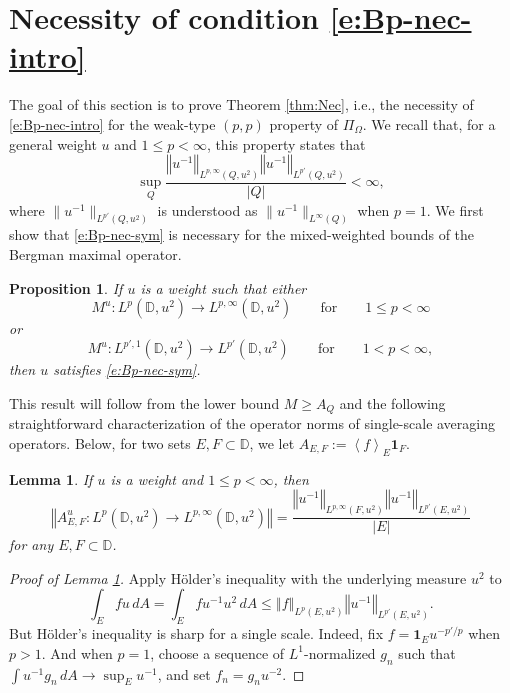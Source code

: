 \documentclass{amsart}
\newcommand{\norm}[1]{\left\Vert {#1}\right\Vert}
\newcommand{\avg}[1]{\left\langle {#1}\right\rangle}
\newtheorem{lemma}[theorem]{Lemma}
\newtheorem{proposition}[theorem]{Proposition}
\theoremstyle{definition}
\numberwithin{equation}{section}
\begin{document}
\section{\texorpdfstring{\boldmath Necessity of condition \eqref{e:Bp-nec-intro}}{}}\label{s:Necessity}

The goal of this section is to prove Theorem \ref{thm:Nec}, i.e., the necessity of \eqref{e:Bp-nec-intro} for the weak-type $(p,p)$ property of $\Pi_{\Omega}$. We recall that, for a general weight $u$ and $1 \leq p<\infty$, this property states that \begin{equation} \sup_Q \frac{\norm{ u^{-1} }_{L^{p,\infty}(Q,u^2)} \norm{u^{-1}}_{L^{p'}(Q,u^2)}}{|Q|} < \infty, \label{e:Bp-nec-sym} \end{equation} where $\|u^{-1}\|_{L^{p'}(Q,u^2)}$ is understood as $\|u^{-1}\|_{L^{\infty}(Q)}$ when $p=1$. We first show that \eqref{e:Bp-nec-sym} is necessary for the mixed-weighted bounds of the Bergman maximal operator. 
\begin{proposition}\label{prop:nec} 
If $u$ is a weight such that either
\[
    M^u\colon L^p(\mathbb{D},u^2) \to L^{p,\infty}(\mathbb{D},u^2) \quad\quad\text{for}\quad\quad1 \le p < \infty
\]
or
\[
    M^u \colon L^{p',1}(\mathbb{D},u^2) \to L^{p'}(\mathbb{D},u^2) \quad\quad\text{for}\quad\quad 1 < p < \infty,
\]
then $u$ satisfies \eqref{e:Bp-nec-sym}.
\end{proposition}
This result will follow from the lower bound $M \ge A_Q$ and the following straightforward characterization of the operator norms of single-scale averaging operators. Below, for two sets $E,F \subset \mathbb D$, we let $A_{E,F} := \avg{f}_E \mathbf 1_F$.
\begin{lemma}\label{l:single-scale}
 If $u$ is a weight and $1 \le p < \infty$, then 
    \[ \norm{ A_{E,F}^u \colon L^{p}(\mathbb{D},u^2) \to L^{p,\infty}(\mathbb{D},u^2) } = \frac{\norm{ u^{-1} }_{L^{p,\infty}(F,u^2)} \norm{u^{-1}}_{L^{p'}(E,u^2)}}{|E|}\]
    for any $E,F \subset \mathbb{D}$.
\end{lemma}
\begin{proof}[Proof of Lemma \ref{l:single-scale}]
    Apply H\"older's inequality with the underlying measure $u^2$ to
        \[ \int_E fu \, dA = \int_E f u^{-1} u^2 \, dA \le \norm{f}_{L^{p}(E,u^2)} \norm{u^{-1}}_{L^{p'}(E,u^2)}.\]
    But H\"older's inequality is sharp for a single scale. Indeed, fix $f= \mathbf 1_E u^{-p'/p}$ when $p>1$. And when $p=1$, choose a sequence of $L^1$-normalized $g_n$ such that $\int u^{-1}g_n \, dA \to \sup_E u^{-1}$, and set $f_n = g_n u^{-2}$.
\end{proof}
\end{document}

